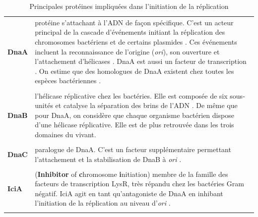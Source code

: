  \begin{longtable}{@{\hspace{-2cm}\hspace{1cm}} >{\bfseries}p{} | >{\small}p{}}
	 \caption{Principales protéines impliquées dans l'initiation de la réplication}
	 \label{taboriini}\\
	 \endfirsthead
	 DnaA & protéine s'attachant à l'ADN de façon spécifique. C'est un acteur principal de la cascade d'événements initiant la réplication des chromosomes bactériens et de certains plasmides \citep{petersen2011origin}. Ces événements incluent la reconnaissance de l'origine (\textit{ori}), son ouverture et l'attachement d'hélicases \citep{higgins2005bacterial}. DnaA est aussi un facteur de transcription \citep{Messer2002}. On estime que des homologues de DnaA existent chez toutes les espèces bactériennes \citep{yoshikawa1991structure,Messer2002}. \\
	\\[-0.2cm]
	DnaB & l'hélicase réplicative chez les bactéries. Elle est composée de six sous-unités et catalyse la séparation des brins de l'ADN \citep{o2013principles}. De même que pour DnaA, on considère que chaque organisme bactérien dispose d'une hélicase réplicative. Elle est de plus retrouvée dans les trois domaines du vivant.\\
	\\[-0.2cm]
	DnaC & paralogue de DnaA. C'est un facteur supplémentaire permettant l'attachement et la stabilisation de DnaB à \textit{ori} \citep{Mott2007}.\\
	\\[-0.2cm]
	IciA & (\textbf{Inhibitor} of \textbf{c}hromosome \textbf{i}nitiation) membre de la famille des facteurs de transcription LysR, très répandu chez les bactéries Gram négatif. IciA agit en tant qu'antagoniste de DnaA en inhibant l'initiation de la réplication au niveau d'\textit{ori} \citep{Dillon2010}.\\
	\\[-0.2cm]

\end{longtable}
